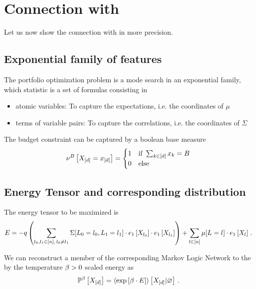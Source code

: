 \documentclass[aps,onecolumn,nofootinbib,pra]{article}
\begin{document}
\section{Connection with \tnreason}

Let us now show the connection with \tnreason in more precision.

\subsection{Exponential family of features}

The portfolio optimization problem is a mode search in an exponential family, which statistic is a set of formulas consisting in 
\begin{itemize}
	\item atomic variables: To capture the expectations, i.e. the coordinates of $\mu$
	\item terms of variable pairs: To capture the correlations, i.e. the coordinates of $\Sigma$
\end{itemize}

The budget constraint can be captured by a boolean base measure
\begin{align*}
	\nu^{B}\left[X_{[d]}=x_{[d]}\right]
	=\begin{cases}
	1 & \text{if } \sum_{k\in[d]}x_{k} = B \\
	0 & \text{else}
	\end{cases}
\end{align*}

\subsection{Energy Tensor and corresponding distribution}

The energy tensor to be maximized is
	\[ E = - q \left(\sum_{l_{0},l_{1}\in[n] , \, l_{0}\neq l_{1}} 
	\Sigma[L_{0}=l_{0},L_{1}=l_{1}] \cdot e_{1}\left[X_{l_{0}}\right]\cdot e_{1}\left[X_{l_{1}}\right]\right) 
	+ \sum_{l\in[n]} \mu[L_{}=l_{}] \cdot e_{1}\left[X_{l}\right] \, . \]

We can reconstruct a member of the corresponding Markov Logic Network to the by the temperature $\beta>0$ scaled energy as
\begin{align*}
	\mathbb{P}^{\beta}\left[X_{[d]}\right] = \left\langle \mathrm{exp}\left[\beta\cdot E\right]\right\rangle \left[ X_{[d]} | \varnothing \right] \, . 
\end{align*}
\end{document}
